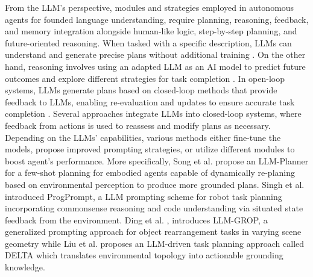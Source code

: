 From the LLM's perspective, modules and strategies employed in autonomous agents for founded language understanding, require planning, reasoning, feedback, and memory integration alongside human-like logic, step-by-step planning, and future-oriented reasoning. When tasked with a specific description, LLMs can understand and generate precise plans without additional training \cite{huang2022language}.
On the other hand, reasoning involves using an adapted LLM as an AI model to predict future outcomes and explore different strategies for task completion \cite{hao2023reasoning}.  In open-loop systems, LLMs generate plans based on closed-loop methods that provide feedback to LLMs, enabling re-evaluation and updates to ensure accurate task completion \cite{jin2023alphablock}. Several approaches \cite{singh2023progprompt, huang2022inner, jin2023alphablock} integrate LLMs into closed-loop systems, where feedback from actions is used to reassess and modify plans as necessary. Depending on the LLMs' capabilities, various methods either fine-tune the models, propose improved prompting strategies, or utilize different modules to boost agent's performance. More specifically, Song et al. \cite{song2023llm} propose an LLM-Planner for a few-shot planning for embodied agents capable of dynamically re-planing based on environmental perception to produce more grounded plans. Singh et al. \cite{singh2023progprompt} introduced ProgPrompt, a LLM prompting scheme for robot task planning incorporating commonsense reasoning and code understanding via situated state feedback from the environment. Ding et al. \cite{dingtask}, introduces LLM-GROP, a generalized prompting approach for object rearrangement tasks in varying scene geometry while Liu et al. \cite{liu2024delta} proposes an LLM-driven task planning approach called DELTA which translates environmental topology into actionable grounding knowledge.


